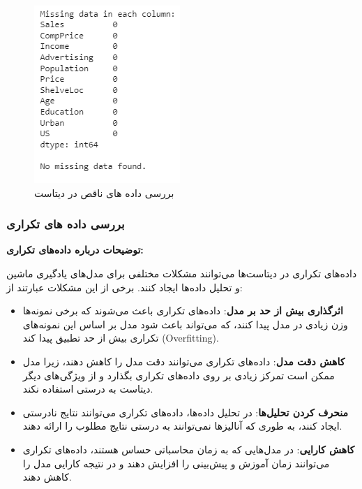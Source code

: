\documentclass{article}
\begin{document}
\begin{figure}[h!]
    \centering
    \includegraphics[width=0.6\linewidth]{q3_p21.png}
    \caption{بررسی داده های ناقص در دیتاست}
    \label{fig321}
\end{figure}


\subsubsection{بررسی داده های تکراری}

\textbf{توضیحات درباره داده‌های تکراری:
}

داده‌های تکراری در دیتاست‌ها می‌توانند مشکلات مختلفی برای مدل‌های یادگیری ماشین و تحلیل داده‌ها ایجاد کنند. برخی از این مشکلات عبارتند از:

\begin{itemize}
    \item \textbf{اثرگذاری بیش از حد بر مدل}: داده‌های تکراری باعث می‌شوند که برخی نمونه‌ها وزن زیادی در مدل پیدا کنند، که می‌تواند باعث شود مدل بر اساس این نمونه‌های تکراری بیش از حد تطبیق پیدا کند (Overfitting).
    
    \item \textbf{کاهش دقت مدل}: داده‌های تکراری می‌توانند دقت مدل را کاهش دهند، زیرا مدل ممکن است تمرکز زیادی بر روی داده‌های تکراری بگذارد و از ویژگی‌های دیگر دیتاست به درستی استفاده نکند.
    
    \item \textbf{منحرف کردن تحلیل‌ها}: در تحلیل داده‌ها، داده‌های تکراری می‌توانند نتایج نادرستی ایجاد کنند، به طوری که آنالیزها نمی‌توانند به درستی نتایج مطلوب را ارائه دهند.
    
    \item \textbf{کاهش کارایی}: در مدل‌هایی که به زمان محاسباتی حساس هستند، داده‌های تکراری می‌توانند زمان آموزش و پیش‌بینی را افزایش دهند و در نتیجه کارایی مدل را کاهش دهند.
\end{itemize}
\end{document}
